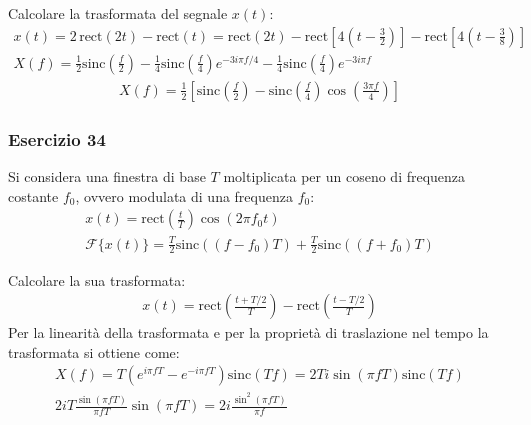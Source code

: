 \documentclass{article}
\newcommand{\rect}{\mathrm{rect}}
\newcommand{\sinc}{\mathrm{sinc}}
\begin{document}
Calcolare la trasformata del segnale $x(t)$:
\begin{gather*}
    x(t)=2\,\rect(2t)-\rect(t)=\rect(2t)-\rect\left[\displaystyle4\left(t-\frac{3}{2}\right)\right]-\rect\left[\displaystyle4\left(t-\frac{3}{8}\right)\right]\\
    X(f)=\displaystyle\frac{1}{2}\sinc\left(\frac{f}{2}\right)-\frac{1}{4}\sinc\left(\frac{f}{4}\right)e^{-3i\pi f/4}-\frac{1}{4}\sinc\left(\frac{f}{4}\right)e^{-3i\pi f}
\end{gather*}
\begin{gather}
    X(f)=\displaystyle\frac{1}{2}\left[\sinc\left(\frac{f}{2}\right)-\sinc\left(\frac{f}{4}\right)\cos\left(\frac{3\pi f}{4}\right)\right]
\end{gather}

\subsubsection*{Esercizio 34}

Si considera una finestra di base $T$ moltiplicata per un coseno di frequenza costante $f_0$, ovvero modulata di una frequenza $f_0$:
\begin{gather*}
    x(t)=\rect\displaystyle\left(\frac{t}{T}\right)\cos(2\pi f_0t)\\
    \mathscr{F}\{x(t)\}=\frac{T}{2}\sinc((f-f_0)T)+\frac{T}{2}\sinc\left((f+f_0)T\right)
\end{gather*}
\begin{center}
\end{center}
Calcolare la sua trasformata:
\begin{gather*}
    x(t)=\rect\left(\displaystyle\frac{t+T/2}{T}\right)-\rect\left(\displaystyle\frac{t-T/2}{T}\right)
\end{gather*}
Per la linearità della trasformata e per la proprietà di traslazione nel tempo la trasformata si ottiene come:
\begin{gather*}
    X(f)=T\left(e^{i\pi fT}-e^{-i\pi fT}\right)\sinc\left(T f\right)=2Ti\sin(\pi fT)\sinc(Tf)\\
    2iT\displaystyle\frac{\sin(\pi fT)}{\pi fT}\sin(\pi fT)=2i\frac{\sin^2(\pi fT)}{\pi f}
\end{gather*}
\end{document}

